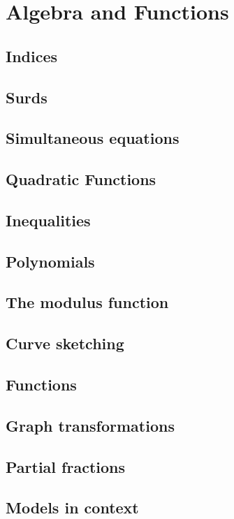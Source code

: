 \chapter{Algebra and Functions} \label{chap:alg_funcs}

\section{Indices}
\section{Surds}
\section{Simultaneous equations}
\section{Quadratic Functions}
\section{Inequalities}
\section{Polynomials}
\section{The modulus function}
\section{Curve sketching}
\section{Functions}
\section{Graph transformations}
\section{Partial fractions}
\section{Models in context}
